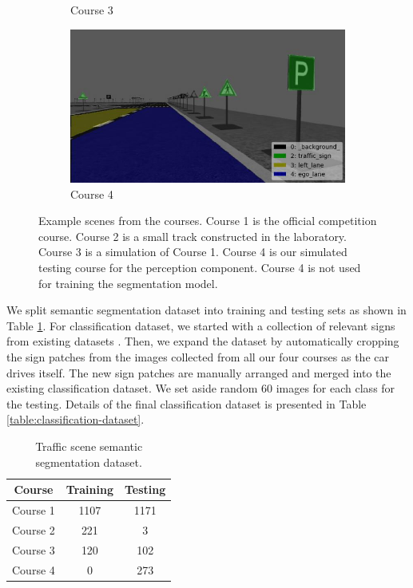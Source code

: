 \begin{figure}[h]
\begin{subfigure}[b]{0.4\linewidth}
    \caption{Course 3}
  \end{subfigure}
  \begin{subfigure}[b]{0.4\linewidth}
    \includegraphics[width=\linewidth]{figures/course4.jpg}
    \caption{Course 4}
  \end{subfigure}
  \caption{Example scenes from the courses. Course 1 is the official competition
    course. Course 2 is a small track constructed in the laboratory. Course 3
    is a simulation of Course 1. Course 4 is our simulated testing course for
    the perception component. Course 4 is not used for training the
    segmentation model.}
  \label{figure:annotated-courses}
\end{figure}

We split semantic segmentation dataset into training and testing sets as shown
in Table \ref{table:semantic-segmentation-dataset}. For classification dataset,
we started with a collection of relevant signs from existing datasets
\cite{Timofte2009MultiviewTS, Stallkamp2012ManVC}. Then, we expand the dataset
by automatically cropping the sign patches from the images collected from all
our four courses as the car drives itself. The new sign patches are manually
arranged and merged into the existing classification dataset. We set aside
random 60 images for each class for the testing. Details of the final
classification dataset is presented in Table
\ref{table:classification-dataset}.

\begin{table}[h]
  \begin{center}
    \caption{Traffic scene semantic segmentation dataset.}
    \label{table:semantic-segmentation-dataset}
    \begin{tabular}{|c|c|c|}
      \hline
      \textbf{Course}   & \textbf{Training} & \textbf{Testing} \\
      \hline
      Course 1          & 1107              & 1171 \\
      \hline
      Course 2          & 221               & 3 \\
      \hline
      Course 3          & 120               & 102 \\
      \hline
      Course 4          & 0                 & 273 \\
      \hline
    \end{tabular}
  \end{center}
\end{table}


